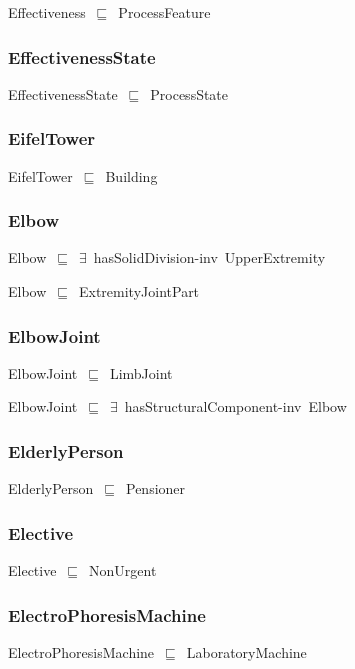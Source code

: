 \documentclass{article}
\begin{document}
Effectiveness~\ensuremath{\sqsubseteq}~ProcessFeature~

\subsubsection*{EffectivenessState}

EffectivenessState~\ensuremath{\sqsubseteq}~ProcessState~

\subsubsection*{EifelTower}

EifelTower~\ensuremath{\sqsubseteq}~Building~

\subsubsection*{Elbow}

Elbow~\ensuremath{\sqsubseteq}~\ensuremath{\exists}~hasSolidDivision-inv~UpperExtremity~

Elbow~\ensuremath{\sqsubseteq}~ExtremityJointPart~

\subsubsection*{ElbowJoint}

ElbowJoint~\ensuremath{\sqsubseteq}~LimbJoint~

ElbowJoint~\ensuremath{\sqsubseteq}~\ensuremath{\exists}~hasStructuralComponent-inv~Elbow~

\subsubsection*{ElderlyPerson}

ElderlyPerson~\ensuremath{\sqsubseteq}~Pensioner~

\subsubsection*{Elective}

Elective~\ensuremath{\sqsubseteq}~NonUrgent~

\subsubsection*{ElectroPhoresisMachine}

ElectroPhoresisMachine~\ensuremath{\sqsubseteq}~LaboratoryMachine~
\end{document}

